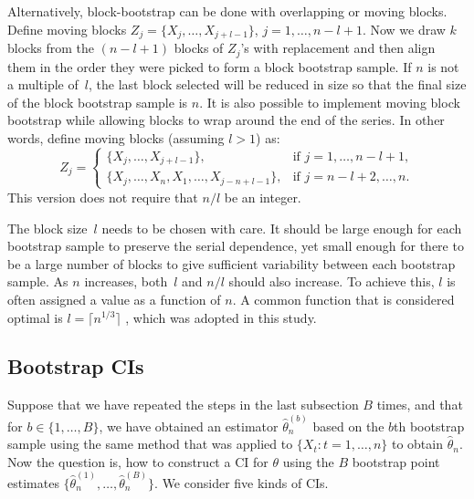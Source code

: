 \documentclass[12pt, letterpaper, titlepage]{article}
\begin{document}
Alternatively, block-bootstrap can be done with overlapping or moving blocks.
Define moving blocks $Z_j = \{X_j, \ldots, X_{j + l - 1}\}$,
$j = 1, \ldots, n - l + 1$. Now we draw $k$ blocks from the $(n - l + 1)$
blocks
of $Z_j$'s with replacement and then align them in the order they were
picked
to form a block bootstrap sample. If $n$ is not a multiple of~$l$, the last
block selected will be reduced in size so that the final size of the
block bootstrap sample is $n$. It is also possible to implement moving block
bootstrap while allowing blocks to wrap around the end of the series. In other
words, define moving blocks (assuming $l > 1$) as:
\begin{equation}
Z_j =
    \begin{cases}
        \{X_j, \ldots, X_{j + l - 1}\}, & \text{if } j = 1, \dots, n - l + 1,\\
        \{X_j, \ldots, X_n, X_1, \ldots, X_{j-n+l-1}\}, & \text{if } j = n - l
        + 2 ,\dots, n.
    \end{cases}
\end{equation}
This version does not require that $n/l$ be an integer.


The block size~$l$ needs to be chosen with care. It should be large enough for
each bootstrap sample to preserve the serial dependence, yet small enough for
there to be a large number of blocks to give sufficient variability between
each bootstrap sample. As $n$ increases, both~$l$
and $n / l$ should also increase. To achieve this, $l$ is
often assigned a value as a function of $n$. A common function that is
considered optimal is $l = \lceil n^{1/3} \rceil$
\citep{buhlmann1999block}, which was adopted in this study.


\subsection{Bootstrap CIs}


Suppose that we have repeated the steps in the last subsection $B$ times, and
that for $b \in \{1, \ldots, B\}$, we have obtained an estimator
$\hat\theta_n^{(b)}$ based on the $b$th bootstrap sample using the same
method
that was applied to $\{X_t: t = 1, \ldots, n\}$ to obtain $\hat\theta_n$.
Now the question is, how to construct a CI for $\theta$
using the $B$ bootstrap point estimates
$\{\hat\theta_n^{(1)}, \ldots, \hat\theta_n^{(B)}\}$.
We consider five kinds of CIs.
\end{document}
